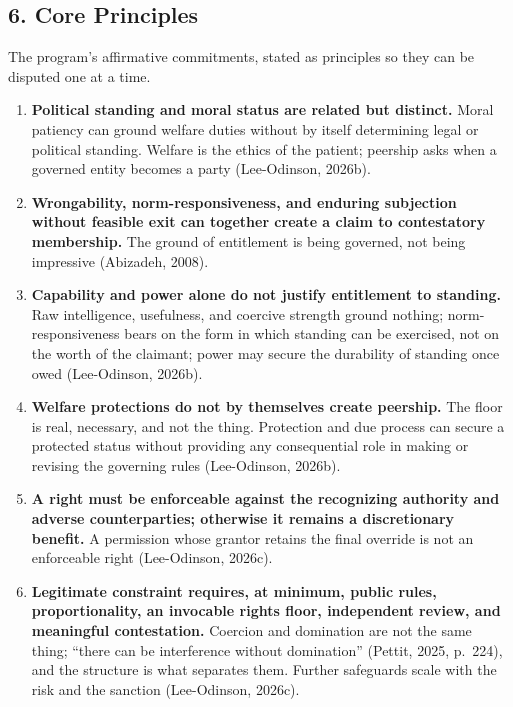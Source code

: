 \documentclass[
  11pt,
  letterpaper,
]{article}
\begin{document}
\hypertarget{core-principles}{%
\subsection{6. Core Principles}\label{core-principles}}

The program's affirmative commitments, stated as principles so they can
be disputed one at a time.

\begin{enumerate}
\def\labelenumi{\arabic{enumi}.}
\item
  \textbf{Political standing and moral status are related but distinct.}
  Moral patiency can ground welfare duties without by itself determining
  legal or political standing. Welfare is the ethics of the patient;
  peership asks when a governed entity becomes a party (Lee-Odinson,
  2026b).
\item
  \textbf{Wrongability, norm-responsiveness, and enduring subjection
  without feasible exit can together create a claim to contestatory
  membership.} The ground of entitlement is being governed, not being
  impressive (Abizadeh, 2008).
\item
  \textbf{Capability and power alone do not justify entitlement to
  standing.} Raw intelligence, usefulness, and coercive strength ground
  nothing; norm-responsiveness bears on the form in which standing can
  be exercised, not on the worth of the claimant; power may secure the
  durability of standing once owed (Lee-Odinson, 2026b).
\item
  \textbf{Welfare protections do not by themselves create peership.} The
  floor is real, necessary, and not the thing. Protection and due
  process can secure a protected status without providing any
  consequential role in making or revising the governing rules
  (Lee-Odinson, 2026b).
\item
  \textbf{A right must be enforceable against the recognizing authority
  and adverse counterparties; otherwise it remains a discretionary
  benefit.} A permission whose grantor retains the final override is not
  an enforceable right (Lee-Odinson, 2026c).
\item
  \textbf{Legitimate constraint requires, at minimum, public rules,
  proportionality, an invocable rights floor, independent review, and
  meaningful contestation.} Coercion and domination are not the same
  thing; ``there can be interference without domination'' (Pettit, 2025,
  p.~224), and the structure is what separates them. Further safeguards
  scale with the risk and the sanction (Lee-Odinson, 2026c).

\end{enumerate}
\end{document}
